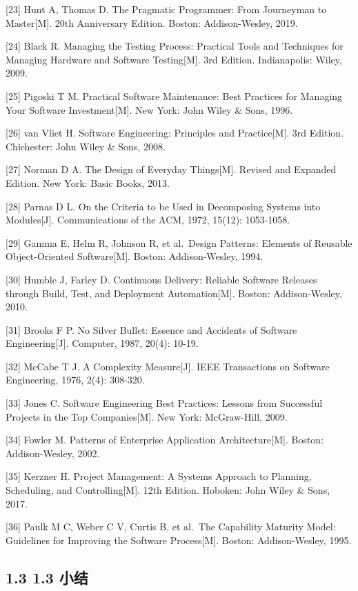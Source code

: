 \documentclass[12pt,a4paper]{article}
\begin{document}
{[}23{]} Hunt A, Thomas D. The Pragmatic Programmer: From Journeyman to
Master{[}M{]}. 20th Anniversary Edition. Boston: Addison-Wesley, 2019.

{[}24{]} Black R. Managing the Testing Process: Practical Tools and
Techniques for Managing Hardware and Software Testing{[}M{]}. 3rd
Edition. Indianapolis: Wiley, 2009.

{[}25{]} Pigoski T M. Practical Software Maintenance: Best Practices for
Managing Your Software Investment{[}M{]}. New York: John Wiley \& Sons,
1996.

{[}26{]} van Vliet H. Software Engineering: Principles and
Practice{[}M{]}. 3rd Edition. Chichester: John Wiley \& Sons, 2008.

{[}27{]} Norman D A. The Design of Everyday Things{[}M{]}. Revised and
Expanded Edition. New York: Basic Books, 2013.

{[}28{]} Parnas D L. On the Criteria to be Used in Decomposing Systems
into Modules{[}J{]}. Communications of the ACM, 1972, 15(12): 1053-1058.

{[}29{]} Gamma E, Helm R, Johnson R, et al.~Design Patterns: Elements of
Reusable Object-Oriented Software{[}M{]}. Boston: Addison-Wesley, 1994.

{[}30{]} Humble J, Farley D. Continuous Delivery: Reliable Software
Releases through Build, Test, and Deployment Automation{[}M{]}. Boston:
Addison-Wesley, 2010.

{[}31{]} Brooks F P. No Silver Bullet: Essence and Accidents of Software
Engineering{[}J{]}. Computer, 1987, 20(4): 10-19.

{[}32{]} McCabe T J. A Complexity Measure{[}J{]}. IEEE Transactions on
Software Engineering, 1976, 2(4): 308-320.

{[}33{]} Jones C. Software Engineering Best Practices: Lessons from
Successful Projects in the Top Companies{[}M{]}. New York: McGraw-Hill,
2009.

{[}34{]} Fowler M. Patterns of Enterprise Application
Architecture{[}M{]}. Boston: Addison-Wesley, 2002.

{[}35{]} Kerzner H. Project Management: A Systems Approach to Planning,
Scheduling, and Controlling{[}M{]}. 12th Edition. Hoboken: John Wiley \&
Sons, 2017.

{[}36{]} Paulk M C, Weber C V, Curtis B, et al.~The Capability Maturity
Model: Guidelines for Improving the Software Process{[}M{]}. Boston:
Addison-Wesley, 1995.

\subsection{1.3 1.3 小结}\label{ux5c0fux7ed3}
\end{document}
